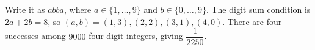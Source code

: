 Write it as $\overline{abba}$, where $a\in\{1,\ldots,9\}$ and $b\in\{0,\ldots,9\}$. The digit sum condition is $2a+2b=8$, so $(a,b)=(1,3),(2,2),(3,1),(4,0)$. There are four successes among $9000$ four-digit integers, giving $\boxed{\dfrac{1}{2250}}$.
